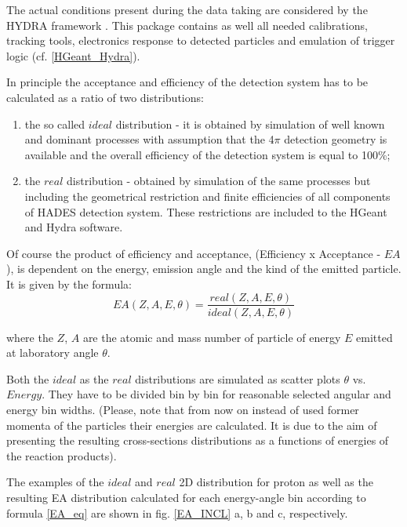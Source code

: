 The actual conditions present during the data taking are considered by the HYDRA framework \cite{HYDRA}. 
This package contains as well all needed calibrations, tracking 
tools, electronics response to detected  particles and emulation of trigger logic (cf. \ref{HGeant_Hydra}). 

In principle the acceptance and efficiency of the detection system has to be calculated as a ratio of two distributions:
\begin{enumerate}[label=\roman*)]
\item the so called $ideal$ distribution - it is obtained by simulation of well known and dominant processes 
with assumption that the 4$\pi$ detection geometry is available and the overall efficiency 
of the detection system is equal to 100\%;  
\item the $real$ distribution - obtained by simulation of the same processes but including the geometrical restriction 
and finite efficiencies of all components of HADES detection system. These restrictions are included 
to the HGeant and Hydra software.
\end{enumerate}

Of course the product of efficiency and acceptance,
(Efficiency x Acceptance - $EA$), is dependent on the energy, emission angle and the kind of the emitted particle. It is given by the formula:\\
\begin{equation}
\label{EA_eq}
    EA(Z, A, E, \theta) = \frac{real(Z, A, E, \theta)}{ideal(Z, A, E, \theta)}
\end{equation}

where the $Z$, $A$ are the atomic and mass number of particle of energy $E$ emitted at laboratory angle $\theta$.

Both the $ideal$ as the $real$  distributions are simulated as scatter plots $\theta$ vs. $Energy$. They have to be divided bin by bin for reasonable selected angular and energy bin widths.
(Please, note that from now on instead of used former momenta of the particles 
their energies are calculated. It is due to the aim of presenting the resulting 
cross-sections distributions as a functions of energies of the reaction products).

The examples of the $ideal$ and $real$ 2D distribution for proton 
as well as the resulting EA distribution calculated for each energy-angle bin according to formula \ref{EA_eq} 
are shown in fig. \ref{EA_INCL} a, b and c, respectively.

